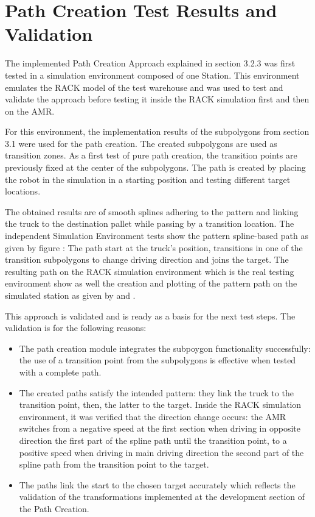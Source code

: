 \section{Path Creation Test Results and Validation}
The implemented Path Creation Approach explained in section 3.2.3 was first tested in a simulation environment
composed of one Station. This environment emulates the RACK model of the test warehouse and was used to test 
and validate the approach before testing it inside the RACK simulation first and then on the AMR.

For this environment, the implementation results of the subpolygons from section 3.1 were used for the path creation.
The created subpolygons are used as transition zones. 
As a first test of pure path creation, the transition points are previously fixed at the center of the 
subpolygons. The path is created by placing the robot in the simulation in a starting position and testing 
different target locations.

The obtained results are of smooth splines adhering to the pattern and linking the truck to the destination pallet 
while passing by a transition location. 
The independent Simulation Environment tests show the pattern spline-based path as given by figure :
The path start at the truck's position, transitions in one of the transition subpolygons to change driving 
direction and joins the target. 
The resulting path on the RACK simulation environment which is the real testing environment show as well 
the creation and plotting of the pattern path on the simulated station as given by  and .

This approach is validated and is ready as a basis for the next test steps. 
The validation is for the following reasons:
\begin{itemize}
    \item The path creation module integrates the subpoygon functionality successfully: the use of a transition
    point from the subpolygons is effective when tested with a complete path.
    \item The created paths satisfy the intended pattern: they link the truck to the transition point, then, 
    the latter to the target. Inside the RACK simulation environment, it was verified that the direction 
    change occurs: the AMR switches from a negative speed at the first section when driving in opposite 
    direction the first part of the spline path until the transition point, to a positive speed when driving in 
    main driving direction the second part of the spline path from the transition point to the target.
    \item The paths link the start to the chosen target accurately which reflects the validation of the 
    transformations implemented at the development section of the Path Creation.
\end{itemize}


